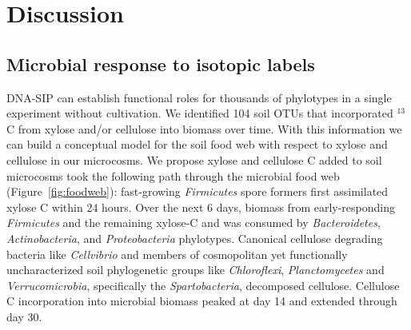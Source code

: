 \section{Discussion} 
\subsection{Microbial response to isotopic labels}
DNA-SIP can establish functional roles for thousands of phylotypes in a single
experiment without cultivation. We identified 104 soil OTUs that incorporated
$^{13}$C from xylose and/or cellulose into biomass over time. With this
information we can build a conceptual model for the soil food web with respect
to xylose and cellulose in our microcosms. We propose xylose and
cellulose C added to soil microcosms took the following path through the
microbial food web (Figure~\ref{fig:foodweb}): fast-growing \textit{Firmicutes}
spore formers first assimilated xylose C within 24 hours. Over the next
6 days, biomass from early-responding \textit{Firmicutes} and the remaining
xylose-C and  was consumed by \textit{Bacteroidetes},
\textit{Actinobacteria}, and \textit{Proteobacteria} phylotypes. Canonical
cellulose degrading bacteria like \textit{Cellvibrio} and members of
cosmopolitan yet functionally uncharacterized soil phylogenetic groups like
\textit{Chloroflexi}, \textit{Planctomycetes} and \textit{Verrucomicrobia},
specifically the \textit{Spartobacteria}, decomposed cellulose. Cellulose
C incorporation into microbial biomass peaked at day 14 and extended through
day 30.

